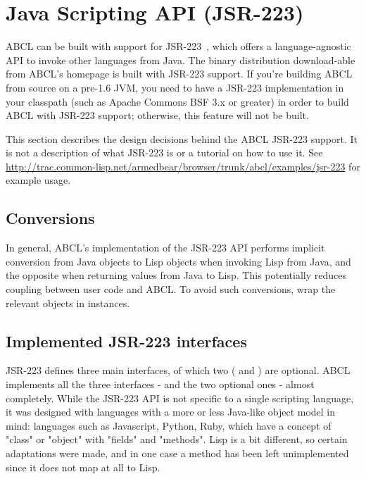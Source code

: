 \documentclass[10pt]{book}
\begin{document}
\section{Java Scripting API (JSR-223)}
\label{sec:java-scripting-api}

ABCL can be built with support for JSR-223~\cite{jsr-223}, which offers
a language-agnostic API to invoke other languages from Java. The binary
distribution download-able from ABCL's homepage is built with JSR-223
support. If you're building ABCL from source on a pre-1.6 JVM, you need
to have a JSR-223 implementation in your classpath (such as Apache
Commons BSF 3.x or greater) in order to build ABCL with JSR-223 support;
otherwise, this feature will not be built.

This section describes the design decisions behind the ABCL JSR-223
support. It is not a description of what JSR-223 is or a tutorial on
how to use it. See
\url{http://trac.common-lisp.net/armedbear/browser/trunk/abcl/examples/jsr-223}
for example usage.

\subsection{Conversions}

In general, ABCL's implementation of the JSR-223 API performs implicit
conversion from Java objects to Lisp objects when invoking Lisp from
Java, and the opposite when returning values from Java to Lisp. This
potentially reduces coupling between user code and ABCL. To avoid such
conversions, wrap the relevant objects in  instances.

\subsection{Implemented JSR-223 interfaces}

JSR-223 defines three main interfaces, of which two (
and ) are optional. ABCL implements all the three
interfaces -  and the two optional ones - almost
completely. While the JSR-223 API is not specific to a single scripting
language, it was designed with languages with a more or less Java-like
object model in mind: languages such as Javascript, Python, Ruby, which
have a concept of "class" or "object" with "fields" and "methods". Lisp
is a bit different, so certain adaptations were made, and in one case a
method has been left unimplemented since it does not map at all to Lisp.
\end{document}
